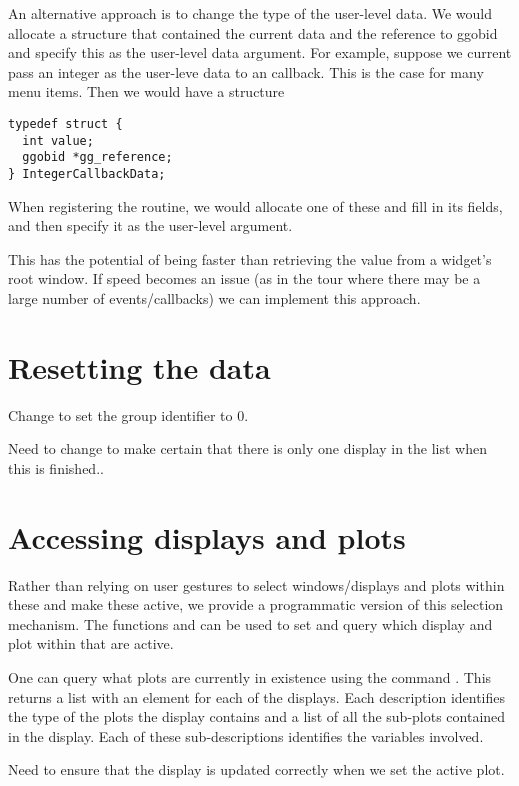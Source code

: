 \documentclass{article}
\begin{document}
An alternative approach is to change the type of the user-level data.
We would allocate a structure that contained the current data and the
reference to ggobid and specify this as the user-level data argument.
For example, suppose we current pass an integer as the user-leve data
to an callback. This is the case for many menu items.  Then we would
have a structure
\begin{verbatim}
typedef struct {
  int value;
  ggobid *gg_reference;
} IntegerCallbackData;
\end{verbatim}
When registering the routine, we would allocate one of these and
fill in its fields, and then specify it as the user-level argument.


This has the potential of being faster than retrieving the value from
a widget's root window. If speed becomes an issue (as in the tour
where there may be a large number of events/callbacks) we can
implement this approach.



\section{Resetting the data}

Change  to set the group identifier to 0.


Need to change  to make certain that there is only
one display in the list when this is finished..



\section{Accessing displays and plots}
Rather than relying on user gestures to select windows/displays and
plots within these and make these active, we provide a programmatic
version of this selection mechanism.  The functions
 and  can be used to
set and query which display and plot within that are active.


One can query what plots are currently in existence using the command
.  This returns a list with an element
for each of the displays. Each description identifies the type of the
plots the display contains and a list of all the sub-plots contained
in the display. Each of these sub-descriptions identifies the
variables involved.



{\red Need to ensure that the display is updated correctly when
we set the active plot.}
\end{document}
